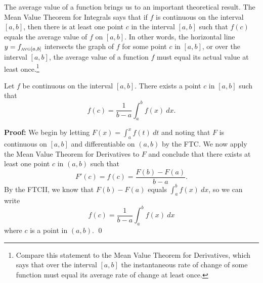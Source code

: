 The average value of a function brings us to an important theoretical result.  The Mean Value Theorem for Integrals says that if $f$ is continuous on the interval $[a,b]$, then there is at least one point $c$ in the interval $[a,b]$ such that $f(c)$ equals the average value of $f$ on $[a,b]$.  In other words, the horizontal line $y = f_{\mbox{\tiny{AVG}}[a,b]}$ intersects the graph of $f$ for some point $c$ in $[a,b]$, or over the interval $[a,b]$, the average value of a function $f$ must equal its actual value at least once.\footnote{Compare this statement to the Mean Value Theorem for Derivatives, which says that over the interval $[a,b]$ the instantaneous rate of change of some function must equal its average rate of change at least once.}

{Let $f$  be continuous on the interval $[a,b]$.  There exists a point $c$ in $[a,b]$ such that
\[ f(c) = \frac{1}{b-a} \int_a^b f(x) \ dx. \]
}

\noindent\textbf{Proof:} We begin by letting $F(x) = \int_a^x f(t) \ dt$ and noting that $F$ is continuous on $[a,b]$ and differentiable on $(a,b)$ by the FTC.  We now apply the Mean Value Theorem for Derivatives to $F$ and conclude that there exists at least one point $c$ in $(a,b)$ such that
\[ F'(c) = f(c) = \frac{F(b) - F(a)}{b-a}. \]
By the FTCII, we know that $F(b) - F(a)$ equals $\int_a^b f(x) \ dx$, so we can write
\[ f(c) = \frac{1}{b-a} \int_a^b f(x) \ dx \]
where $c$ is a point in $(a,b)$. \qed


